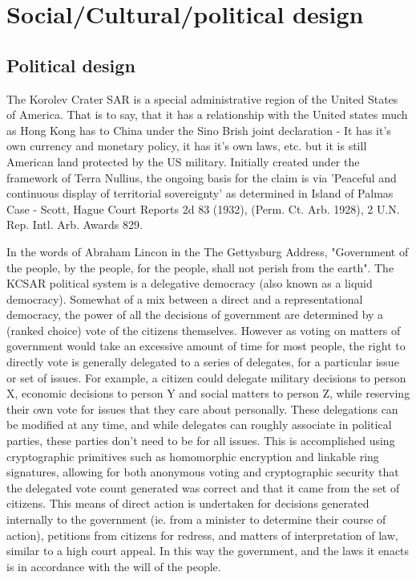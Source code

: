 \documentclass[10pt]{article}
\begin{document}
\section*{Social/Cultural/political design}

\subsection*{Political design}
The Korolev Crater SAR is a special administrative region of the United States of America. That is to say, that it has a relationship with the United states much as Hong Kong has to China under the Sino Brish joint declaration - It has it's own currency and monetary policy, it has it's own laws, etc. but it is still American land protected by the US military. Initially created under the framework of Terra Nullius, the ongoing basis for the claim is via 'Peaceful and continuous display of territorial sovereignty' as determined in Island of Palmas Case - Scott, Hague Court Reports 2d 83 (1932), (Perm. Ct. Arb. 1928), 2 U.N. Rep. Intl. Arb. Awards 829. 

In the words of Abraham Lincon in the The Gettysburg Address, "Government of the people, by the people, for the people, shall not perish from the earth". The KCSAR political system is a delegative democracy (also known as a liquid democracy). Somewhat of a mix between a direct and a representational democracy, the power of all the decisions of government are determined by a (ranked choice) vote of the citizens themselves. However as voting on matters of government would take an excessive amount of time for most people, the right to directly vote is generally delegated to a series of delegates, for a particular issue or set of issues. For example, a citizen could delegate military decisions to person X, economic decisions to person Y and social matters to person Z, while reserving their own vote for issues that they care about personally. These delegations can be modified at any time, and while delegates can roughly associate in political parties, these parties don't need to be for all issues. This is accomplished using cryptographic primitives such as homomorphic encryption and linkable ring signatures, allowing for both anonymous voting and cryptographic security that the delegated vote count generated was correct and that it came from the set of citizens. This means of direct action is undertaken for decisions generated internally to the government (ie. from a minister to determine their course of action), petitions from citizens for redress, and matters of interpretation of law, similar to a high court appeal. In this way the government, and the laws it enacts is in accordance with the will of the people.
\end{document}

